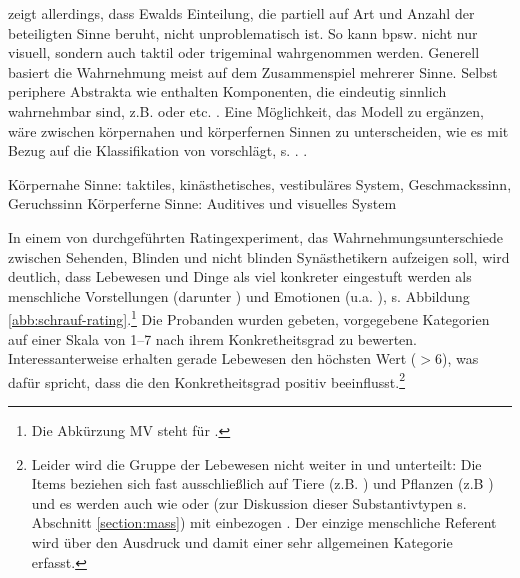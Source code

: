 \textcite{Schrauf2011} zeigt allerdings, dass Ewalds Einteilung, die partiell auf Art und Anzahl der beteiligten Sinne beruht, nicht unproblematisch ist. So kann  bpsw. nicht nur visuell, sondern auch taktil oder trigeminal wahrgenommen werden. Generell basiert die Wahrnehmung meist auf dem Zusammenspiel mehrerer Sinne. Selbst periphere Abstrakta  wie  enthalten Komponenten, die eindeutig sinnlich wahrnehmbar sind, z.B.  oder  etc. \parencite[vgl.][41]{Schrauf2011}. 
Eine Möglichkeit, das Modell zu ergänzen, wäre zwischen körpernahen und körperfernen Sinnen zu unterscheiden, wie es \textcite[42]{Schrauf2011} mit Bezug auf die Klassifikation von \textcite{Zimmer2007} vorschlägt, s. .  \parencite[42]{Schrauf2011}.   

\begin{exe}
	\ex \label{sinne}
	\begin{xlist}
		\ex \label{nah} Körpernahe Sinne:  taktiles, kinästhetisches, vestibuläres System, Geschmackssinn, Geruchssinn
		\ex \label{fern} Körperferne Sinne: Auditives und visuelles System
	\end{xlist}
\end{exe}

In einem von \textcite[163--166]{Schrauf2011} durchgeführten Ratingexperiment, das Wahrnehmungsunterschiede zwischen Sehenden, Blinden und nicht blinden Synästhetikern aufzeigen soll, wird deutlich, dass Lebewesen und Dinge als viel konkreter eingestuft werden als menschliche Vorstellungen (darunter ) und Emotionen (u.a. ), s. Abbildung \ref{abb:schrauf-rating}.\footnote{Die Abkürzung MV steht für .} Die Probanden wurden gebeten, vorgegebene Kategorien auf einer Skala von 1--7 nach ihrem Konkretheitsgrad  zu bewerten. Interessanterweise erhalten gerade Lebewesen den höchsten Wert ($>6$), was dafür spricht, dass die  den Konkretheitsgrad  positiv beeinflusst.\footnote{Leider wird die Gruppe der Lebewesen nicht weiter in  und  unterteilt: Die Items beziehen sich fast ausschließlich auf Tiere (z.B. ) und Pflanzen (z.B ) und es werden auch  wie  oder  (zur Diskussion dieser  Substantivtypen s. Abschnitt \ref{section:mass}) mit einbezogen \parencite[143]{Schrauf2011}. Der einzige menschliche Referent wird über den Ausdruck  und damit einer sehr allgemeinen Kategorie erfasst.}

